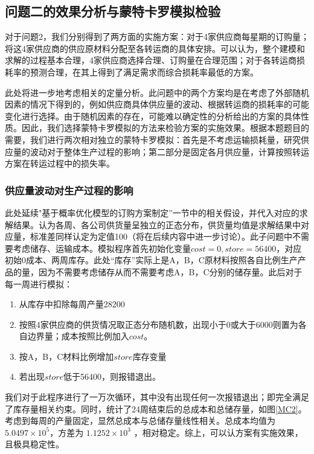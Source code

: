 \documentclass{my_paper}
\begin{document}
\subsection{问题二的效果分析与蒙特卡罗模拟检验}

对于问题2，我们分别得到了两方面的实施方案：对于4家供应商每星期的订购量；将这4家供应商的供应原材料分配至各转运商的具体安排。可以认为，整个建模和求解的过程基本合理，4家供应商选择合理、订购量在合理范围；对于各转运商损耗率的预测合理，在其上得到了满足需求而综合损耗率最低的方案。

此处将进一步地考虑相关的定量分析。此问题中的两个方案均是在考虑了外部随机因素的情况下得到的，例如供应商具体供应量的波动、根据转运商的损耗率的可能变化进行选择。由于随机因素的存在，可能难以确定性的分析给出的方案的具体性质。因此，我们选择蒙特卡罗模拟的方法来检验方案的实施效果。根据本题题目的需要，我们进行两次相对独立的蒙特卡罗模拟：首先是不考虑运输损耗量，研究供应量的波动对于整体生产过程的影响；第二部分是固定各月供应量，计算按照转运方案在转运过程中的损失率。

\subsubsection{供应量波动对生产过程的影响}
此处延续"基于概率优化模型的订购方案制定''一节中的相关假设，并代入对应的求解结果。认为各周、各公司供货量呈独立的正态分布，供货量均值是求解结果中对应量，标准差同样认定为定值100（将在后续内容中进一步讨论）。此子问题中不需要考虑储存、运输成本。模拟程序首先初始化变量$cost=0,store=56400$，对应初始0成本、两周库存。此处“库存”实际上是A，B，C原材料按照各自比例生产产品的量，因为不需要考虑储存从而不需要考虑A，B，C分别的储存量。此后对于每一周进行模拟：

\begin{enumerate}
\item 从库存中扣除每周产量28200
\item 按照4家供应商的供货情况取正态分布随机数，出现小于0或大于6000则置为各自边界量；成本按照比例加入$cost$。
\item 按A，B，C材料比例增加$store$库存变量
\item 若出现$store$低于56400，则报错退出。
\end{enumerate}

我们对于此程序进行了一万次循环，其中没有出现任何一次报错退出；即完全满足了库存量相关约束。同时，统计了24周结束后的总成本和总储存量，如图\ref{MC2}。考虑到每周的产量固定，显然总成本与总储存量线性相关。总成本均值为$5.0497 \times 10^5$，方差为 $ 1.1252\times 10^3 $ ，相对稳定。综上，可以认方案有实施效果，且极具稳定性。
\end{document}
